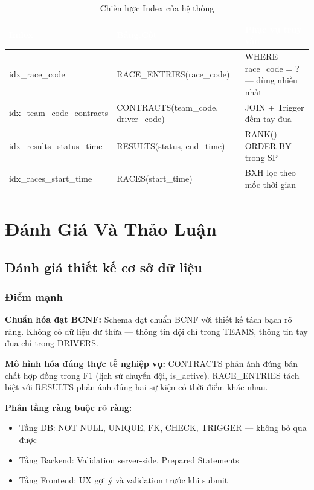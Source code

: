 \documentclass[13pt, a4paper]{report}
\begin{document}
\begin{table}[h]
\centering\small
\caption{Chiến lược Index của hệ thống}
\begin{tabularx}{\textwidth}{L{4.5cm} L{3cm} L{5.5cm}}
\toprule
{}
\textcolor{white}{\textbf{Index}} & \textcolor{white}{\textbf{Bảng.Cột}} &
\textcolor{white}{\textbf{Phục vụ truy vấn}} \\
\midrule
idx\_race\_code & RACE\_ENTRIES(race\_code) & WHERE race\_code = ? --- dùng nhiều nhất \\
idx\_team\_code\_contracts & CONTRACTS(team\_code, driver\_code) & JOIN + Trigger đếm tay đua \\
idx\_results\_status\_time & RESULTS(status, end\_time) & RANK() ORDER BY trong SP \\
idx\_races\_start\_time & RACES(start\_time) & BXH lọc theo mốc thời gian \\
\bottomrule
\end{tabularx}
\end{table}

\chapter{Đánh Giá Và Thảo Luận}

\section{Đánh giá thiết kế cơ sở dữ liệu}

\subsection{Điểm mạnh}

\textbf{Chuẩn hóa đạt BCNF:} Schema đạt chuẩn BCNF với thiết kế tách bạch rõ ràng. Không có dữ liệu dư thừa --- thông tin đội chỉ trong TEAMS, thông tin tay đua chỉ trong DRIVERS.

\textbf{Mô hình hóa đúng thực tế nghiệp vụ:} CONTRACTS phản ánh đúng bản chất hợp đồng trong F1 (lịch sử chuyển đội, is\_active). RACE\_ENTRIES tách biệt với RESULTS phản ánh đúng hai sự kiện có thời điểm khác nhau.

\textbf{Phân tầng ràng buộc rõ ràng:}
\begin{itemize}[leftmargin=1.5cm]
  \item Tầng DB: NOT NULL, UNIQUE, FK, CHECK, TRIGGER --- không bỏ qua được
  \item Tầng Backend: Validation server-side, Prepared Statements
  \item Tầng Frontend: UX gợi ý và validation trước khi submit
\end{itemize}
\end{document}
